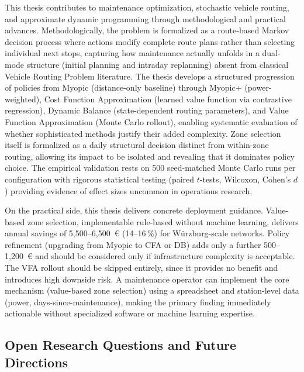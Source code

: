 \documentclass[12pt,oneside]{article}
\begin{document}
This thesis contributes to maintenance optimization, stochastic vehicle routing, and approximate dynamic programming through methodological and practical advances. Methodologically, the problem is formalized as a route-based Markov decision process where actions modify complete route plans rather than selecting individual next stops, capturing how maintenance actually unfolds in a dual-mode structure (initial planning and intraday replanning) absent from classical Vehicle Routing Problem literature. The thesis develops a structured progression of policies from Myopic (distance-only baseline) through Myopic+ (power-weighted), Cost Function Approximation (learned value function via contrastive regression), Dynamic Balance (state-dependent routing parameters), and Value Function Approximation (Monte Carlo rollout), enabling systematic evaluation of whether sophisticated methods justify their added complexity. Zone selection itself is formalized as a daily structural decision distinct from within-zone routing, allowing its impact to be isolated and revealing that it dominates policy choice. The empirical validation rests on 500 seed-matched Monte Carlo runs per configuration with rigorous statistical testing (paired $t$-tests, Wilcoxon, Cohen's $d$) providing evidence of effect sizes uncommon in operations research.

On the practical side, this thesis delivers concrete deployment guidance. Value-based zone selection, implementable rule-based without machine learning, delivers annual savings of 5{,}500--6{,}500~€ (14--16\,\%) for Würzburg-scale networks. Policy refinement (upgrading from Myopic to CFA or DB) adds only a further 500--1{,}200~€ and should be considered only if infrastructure complexity is acceptable. The VFA rollout should be skipped entirely, since it provides no benefit and introduces high downside risk. A maintenance operator can implement the core mechanism (value-based zone selection) using a spreadsheet and station-level data (power, days-since-maintenance), making the primary finding immediately actionable without specialized software or machine learning expertise.

\subsection{Open Research Questions and Future Directions}\label{subsec_open_research_questions_and_future_directions}
\end{document}
